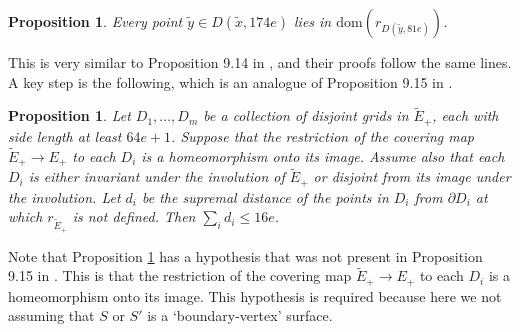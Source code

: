 \documentclass[oneside]{amsart}
\numberwithin{equation}{section}
\theoremstyle{plain}
\newtheorem{proposition}[equation]{Proposition}
\theoremstyle{definition}
\begin{document}
\begin{proposition}
\label{Prop:GridFirstReturn}
Every point $\tilde y \in D(\tilde x, 174e)$ lies in $\mathrm{dom}(r_{D(\tilde y,81e)})$.
\end{proposition}

This is very similar to Proposition 9.14 in \cite{Lackenby:PolyUnknot}, and their proofs follow the same lines.
A key step is the following, which is an analogue of Proposition 9.15 in \cite{Lackenby:PolyUnknot}.

\begin{proposition}
\label{Prop:GridFirstReturnTildeE}
Let $D_1, \dots, D_m$ be a collection of disjoint grids in $\tilde E_+$, each with side length at least 
$64e+1$. Suppose that the restriction of the covering map $\tilde E_+ \rightarrow E_+$ to each $D_i$ is a homeomorphism
onto its image. Assume also that each $D_i$ is either invariant under the involution of $\tilde E_+$ or disjoint from
its image under the involution.
Let $d_i$ be the supremal distance of the points in $D_i$ from $\partial D_i$ at which
$r_{\tilde E_+}$ is not defined. Then $\sum_i d_i \leq 16e$.
\end{proposition}

Note that Proposition \ref{Prop:GridFirstReturnTildeE} has a hypothesis that was not present
in Proposition 9.15 in \cite{Lackenby:PolyUnknot}. This is that the restriction of the covering map 
$\tilde E_+ \rightarrow E_+$ to each $D_i$ is a homeomorphism onto its image. This hypothesis is required
because here we not assuming that $S$ or $S'$ is a `boundary-vertex' surface.
\end{document}
